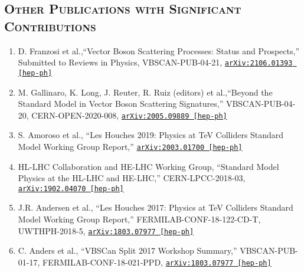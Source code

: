 \documentclass[10pt]{res} %
\begin{document}
\begin{resume}
\section{\textsc{Other Publications with Significant Contributions}}
\begin{enumerate}
  \item D. Franzosi et al.,``Vector Boson Scattering Processes: Status and Prospects,''
    Submitted to Reviews in Physics, VBSCAN-PUB-04-21, \href{https://arxiv.org/abs/2106.01393}{\texttt{arXiv:2106.01393 [hep-ph]}}
  \item M. Gallinaro, K. Long, J. Reuter, R. Ruiz (editors) et al.,``Beyond the Standard Model in Vector Boson Scattering Signatures,''
    VBSCAN-PUB-04-20, CERN-OPEN-2020-008, \href{https://arxiv.org/abs/2005.09889}{\texttt{arXiv:2005.09889 [hep-ph]}}
  \item S. Amoroso et al., ``Les Houches 2019: Physics at TeV Colliders Standard Model Working Group Report,''
    \href{https://arxiv.org/abs/2003.01700 } {\texttt{arXiv:2003.01700 [hep-ph]}}
  \item HL-LHC Collaboration and HE-LHC Working Group, ``Standard Model Physics at the HL-LHC and HE-LHC,''
    CERN-LPCC-2018-03, \href{https://arxiv.org/abs/1902.04070}{\texttt{arXiv:1902.04070 [hep-ph]}}
  \item J.R. Andersen et al., ``Les Houches 2017: Physics at TeV Colliders Standard Model Working Group Report,''
    FERMILAB-CONF-18-122-CD-T, UWTHPH-2018-5, \href{https://arxiv.org/abs/1803.07977}{\texttt{arXiv:1803.07977 [hep-ph]}}
  \item C. Anders et al., ``VBSCan Split 2017 Workshop Summary,'' 
    VBSCAN-PUB-01-17, FERMILAB-CONF-18-021-PPD, \href{https://arxiv.org/abs/1801.04203}{\texttt{arXiv:1803.07977  [hep-ph]}}
\end{enumerate}


\end{resume}
\end{document}

